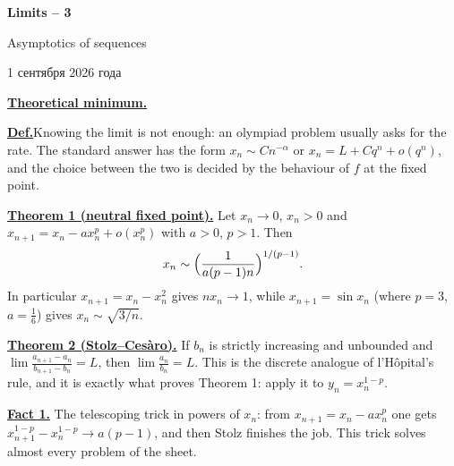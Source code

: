 \documentclass[11pt,a4paper]{article}
\newcommand{\head}[2][0pt]{\par\vspace{\dimexpr0.85em+#1\relax}\noindent\textbf{\underline{#2}}\quad}
\begin{document}
\begin{center}
{\huge\bfseries Limits -- 3\par}\vspace{1.07em}
{\Large Asymptotics of sequences\par}\vspace{1.1em}
{\foreignlanguage{russian}{1 сентября 2026 года}\par}
\end{center}\vspace{0pt}

\noindent\textbf{\underline{Theoretical minimum.}}

\vspace{5pt}\noindent\textbf{\underline{Def.}}\quad Knowing the limit is not enough: an olympiad
problem usually asks for the rate. The standard answer has the form $x_n\sim Cn^{-\alpha}$ or
$x_n=L+Cq^n+o(q^n)$, and the choice between the two is decided by the behaviour of $f$ at the
fixed point.

\head{Theorem 1 (neutral fixed point).} Let $x_n\to0$, $x_n>0$ and
$x_{n+1}=x_n-ax_n^p+o(x_n^p)$ with $a>0$, $p>1$. Then
\[
x_n\sim\Bigl(\frac1{a(p-1)n}\Bigr)^{1/(p-1)}.
\]
In particular $x_{n+1}=x_n-x_n^2$ gives $nx_n\to1$, while $x_{n+1}=\sin x_n$ (where $p=3$,
$a=\frac16$) gives $x_n\sim\sqrt{3/n}$.

\head[5.8pt]{Theorem 2 (Stolz--Ces\`aro).} If $b_n$ is strictly increasing and unbounded and
$\lim\frac{a_{n+1}-a_n}{b_{n+1}-b_n}=L$, then $\lim\frac{a_n}{b_n}=L$. This is the discrete
analogue of l'H\^opital's rule, and it is exactly what proves Theorem 1: apply it to
$y_n=x_n^{1-p}$.

\head[3.5pt]{Fact 1.} The telescoping trick in powers of $x_n$: from $x_{n+1}=x_n-ax_n^p$ one gets
$x_{n+1}^{1-p}-x_n^{1-p}\to a(p-1)$, and then Stolz finishes the job. This trick solves almost
every problem of the sheet.
\end{document}
